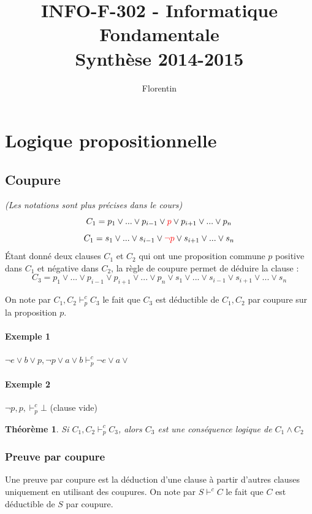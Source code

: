 \documentclass[a4paper]{article}
\title{
    INFO-F-302 - Informatique Fondamentale\\
    \small Synthèse 2014-2015
}
\author{Florentin \bsc{Hennecker}}
\date{}
\newtheorem{theorem}{Théorème}[section]
\begin{document}
\maketitle
\tableofcontents

\section{Logique propositionnelle}

  \subsection{Coupure}
  \textit{(Les notations sont plus précises dans le cours)}\\
  $$ C_1 = p_1 \lor ... \lor p_{i-1} \lor \textcolor{red}{p} \lor 
p_{i+1} \lor ... \lor p_n$$
  $$ C_1 = s_1 \lor ... \lor s_{i-1} \lor \textcolor{red}{\lnot p} \lor 
s_{i+1} \lor ... \lor s_n$$
  \'Etant donné deux clauses $C_1$ et $C_2$ qui ont une proposition 
commune $p$
  positive dans $C_1$ et négative dans $C_2$, la règle de coupure permet 
de déduire
  la clause : 
  $$ C_3 = p_1 \lor ... \lor p_{i-1} \lor p_{i+1} \lor ... \lor p_n
     \lor s_1 \lor ... \lor s_{i-1} \lor s_{i+1} \lor ... \lor s_n$$

  On note par $C_1, C_2 \vdash^c_p C_3$ le fait que $C_3$ est déductible 
de 
  $C_1, C_2$ par coupure sur la proposition $p$.

  \paragraph{Exemple 1} $ \lnot e \lor b \lor p, \lnot p \lor a \lor b 
\vdash^c_p \lnot e \lor a \lor $
  \paragraph{Exemple 2} $ \lnot p, p, \vdash^c_p \bot $ (clause vide)

  \begin{theorem}
  Si $C_1, C_2 \vdash^c_p C_3$, alors $C_3$ est une conséquence logique 
de $C_1 \land C_2$
  \end{theorem}

  \subsubsection{Preuve par coupure}
  Une preuve par coupure est la déduction d'une clause à partir d'autres 
clauses uniquement
  en utilisant des coupures. On note par $S \vdash^c C$ le fait que $C$ 
est déductible de $S$ par coupure.
\end{document}
